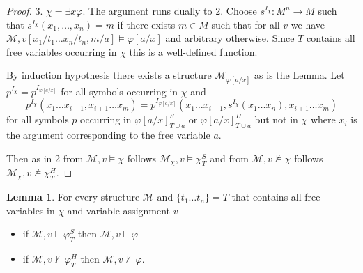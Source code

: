 \documentclass[a4paper,12pt]{report}
\theoremstyle{definition}
\theoremstyle{definition}
\theoremstyle{definition}
\newtheorem{lemma}[theorem]{Lemma}
\theoremstyle{definition}
\theoremstyle{definition}
\theoremstyle{definition}
\theoremstyle{definition}
\begin{document}
\begin{proof}
		3. $\chi = \exists x\varphi$. The argument runs dually to 2. Choose $s^{I_\chi}:M^n\to M$ such that $s^{I_\chi}(x_1,\dots, x_n) = m$ if there exists $m\in M$ such that for all $v$ we have $\mathcal M, v[x_1/t_1\dots x_n/t_n, m/a]\models\varphi[a/x]$ and arbitrary otherwise. Since $T$ contains all free variables occurring in $\chi$ this is a well-defined function.
		
		By induction hypothesis there exists a structure $\mathcal M_{\varphi[a/x]}$ as is the Lemma. Let $p^{I_\chi} = p^{I_{\varphi[a/x]}}$ for all symbols occurring in $\chi$ and $$p^{I_\chi}(x_1\dots x_{i-1}, x_{i+1}\dots x_m) = p^{I_{\varphi[a/x]}}(x_1\dots x_{i-1}, s^{I_\chi}(x_1\dots x_n), x_{i+1}\dots x_m)$$ for all symbols $p$ occurring in $\varphi[a/x]^S_{T\cup a}$ or $\varphi[a/x]^H_{T\cup a}$ but not in $\chi$ where $x_i$ is the argument corresponding to the free variable $a$.
		
		Then as in 2 from $\mathcal M, v\models \chi$ follows $\mathcal M_\chi,v\models\chi^S_T$ and from $\mathcal M, v\not\models \chi$ follows $\mathcal M_\chi,v\not\models\chi^H_T$.
	\end{proof}
	
	\begin{lemma}
		For every structure $\mathcal M$ and $\{t_1\dots t_n\} = T$ that contains all free variables in $\chi$ and variable assignment $v$
		\begin{itemize}
			\item if $\mathcal M, v\models\varphi^S_T$ then $\mathcal M, v\models \varphi$
			\item if $\mathcal M, v\not\models\varphi^H_T$ then $\mathcal M, v\not\models\varphi$.
		\end{itemize}
	\end{lemma}
\end{document}
